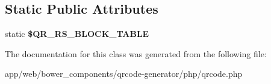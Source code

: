 \subsection*{Static Public Attributes}
\begin{DoxyCompactItemize}
\item 
\mbox{\label{class_q_r_r_s_block_a9eb430fa606373cee2a22ebed1f5c2a8}} 
static {\bfseries \$\+Q\+R\+\_\+\+R\+S\+\_\+\+B\+L\+O\+C\+K\+\_\+\+T\+A\+B\+LE}
\end{DoxyCompactItemize}


The documentation for this class was generated from the following file\+:\begin{DoxyCompactItemize}
\item 
app/web/bower\+\_\+components/qrcode-\/generator/php/qrcode.\+php\end{DoxyCompactItemize}
